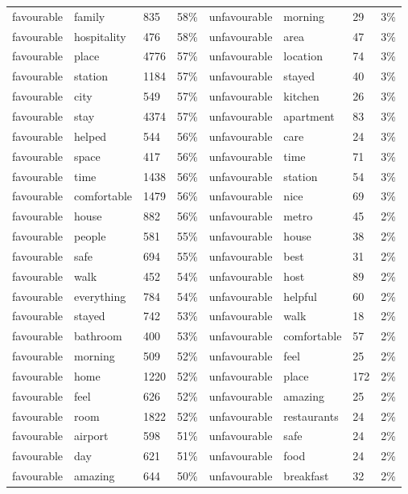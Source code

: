 \documentclass[a4paper, 12pt]{article}
\begin{document}
\begin{longtable}{p{2cm}p{2cm}p{1cm}p{1.6cm}p{2.4cm}p{1.9cm}p{1cm}p{2cm}}
favourable & family & 835 & 58\% & unfavourable & morning & 29 & 3\% \\
favourable & hospitality & 476 & 58\% & unfavourable & area & 47 & 3\% \\
favourable & place & 4776 & 57\% & unfavourable & location & 74 & 3\% \\
favourable & station & 1184 & 57\% & unfavourable & stayed & 40 & 3\% \\
favourable & city & 549 & 57\% & unfavourable & kitchen & 26 & 3\% \\
favourable & stay & 4374 & 57\% & unfavourable & apartment & 83 & 3\% \\
favourable & helped & 544 & 56\% & unfavourable & care & 24 & 3\% \\
favourable & space & 417 & 56\% & unfavourable & time & 71 & 3\% \\
favourable & time & 1438 & 56\% & unfavourable & station & 54 & 3\% \\
favourable & comfortable & 1479 & 56\% & unfavourable & nice & 69 & 3\% \\
favourable & house & 882 & 56\% & unfavourable & metro & 45 & 2\% \\
favourable & people & 581 & 55\% & unfavourable & house & 38 & 2\% \\
favourable & safe & 694 & 55\% & unfavourable & best & 31 & 2\% \\
favourable & walk & 452 & 54\% & unfavourable & host & 89 & 2\% \\
favourable & everything & 784 & 54\% & unfavourable & helpful & 60 & 2\% \\
favourable & stayed & 742 & 53\% & unfavourable & walk & 18 & 2\% \\
favourable & bathroom & 400 & 53\% & unfavourable & comfortable & 57 & 2\% \\
favourable & morning & 509 & 52\% & unfavourable & feel & 25 & 2\% \\
favourable & home & 1220 & 52\% & unfavourable & place & 172 & 2\% \\
favourable & feel & 626 & 52\% & unfavourable & amazing & 25 & 2\% \\
favourable & room & 1822 & 52\% & unfavourable & restaurants & 24 & 2\% \\
favourable & airport & 598 & 51\% & unfavourable & safe & 24 & 2\% \\
favourable & day & 621 & 51\% & unfavourable & food & 24 & 2\% \\
favourable & amazing & 644 & 50\% & unfavourable & breakfast & 32 & 2\% \\

\end{longtable}
\end{document}
